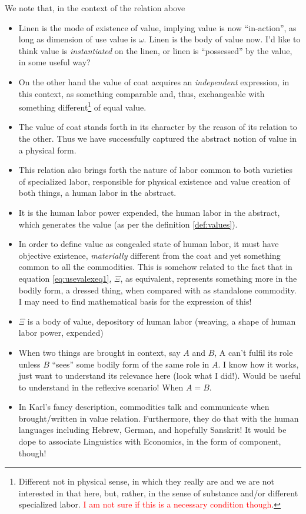 \documentclass[12pt]{extarticle}
\theoremstyle{definition}
\newenvironment{remark}[1][Remark]{\begin{trivlist}
\item[\hskip \labelsep {\bfseries #1}]}{\end{trivlist}}
\begin{document}
\begin{remark}
  We note that, in the context of the relation above
  \begin{itemize}
  \item Linen is the mode of existence of value, implying value is now ``in-action'', as long as dimension of use value is $\omega$.  Linen is the body of value now.  I'd like to think value is \emph{instantiated} on the linen, or linen is ``possessed'' by the value, in some useful way?
  \item On the other hand the value of coat acquires an \emph{independent} expression, in this context, as something comparable and, thus, exchangeable with something different\footnote{Different not in physical sense, in which they really are and we are not interested in that here, but, rather, in the sense of substance and/or different specialized labor.  \textcolor{red}{I am not sure if this is a necessary condition though}.} of equal value.
  \item The value of coat stands forth in its character by the reason of its relation to the other.  Thus we have successfully captured the abstract notion of value in a physical form.
  \item This relation also brings forth the nature of labor common to both varieties of specialized labor, responsible for physical existence and value creation of both things, a human labor in the abstract.
    \item It is the human labor power expended, the human labor in the abstract, which generates the value (as per the definition \ref{def:values}).
    \item In order to define value as congealed state of human labor, it must have objective existence, \emph{materially} different from the coat and yet something common to all the commodities.  This is somehow related to the fact that in equation \ref{eq:usevalexeq1}, $\Xi$, as equivalent, represents something more in the bodily form, a dressed thing, when compared with as standalone commodity.  I may need to find mathematical basis for the expression of this!
    \item $\Xi$ is a body of value, depository of human labor (weaving, a shape of human labor power, expended)
    \item When two things are brought in context, say $A$ and $B$, A can't fulfil its role unless $B$ ``sees'' some bodily form of the same role in $A$.  I know how it works, just want to understand its relevance here (look what I did!).  Would be useful to understand in the reflexive scenario!  When $A=B$.
      \item In Karl's fancy description, commodities talk and communicate when brought/written in value relation.  Furthermore, they do that with the human languages including Hebrew, German, and hopefully Sanskrit!  It would be dope to associate Linguistics with Economics, in the form of component, though!
  \end{itemize}
\end{remark}
\end{document}
